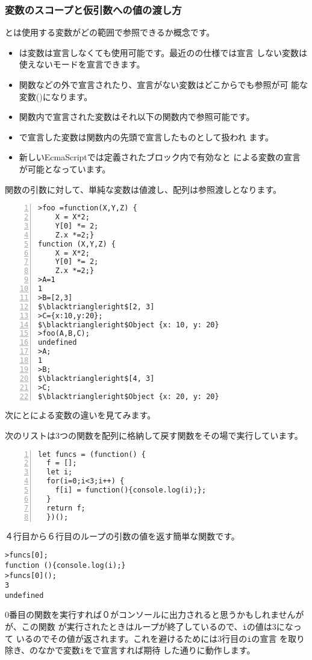 \subsubsection{変数のスコープと仮引数への値の渡し方}
とは使用する変数がどの範囲で参照できるか概念です。
\begin{itemize}
 \item \JS は変数は宣言しなくても使用可能です。最近の\JS の仕様では宣言
			 しない変数は使えないモードを宣言できます。
 \item 関数などの外で宣言されたり、宣言がない変数はどこからでも参照が可
			 能な変数()になります。
 \item 関数内で宣言された変数はそれ以下の関数内で参照可能です。
 \item {}で宣言した変数は関数内の先頭で宣言したものとして扱われ
			 ます。
 \item 新しいEcmaScriptでは定義されたブロック内で有効なと
			 による変数の宣言が可能となっています。
\end{itemize}
関数の引数に対して、単純な変数は値渡し、配列は参照渡しとなります。
\begin{Verbatim}[numbers=left, fontsize=\small,
	commandchars=\\//,codes={\catcode`$=3\catcode`^=7}]
>foo =function(X,Y,Z) {
    X = X*2;
    Y[0] *= 2;
    Z.x *=2;}
function (X,Y,Z) {
    X = X*2;
    Y[0] *= 2;
    Z.x *=2;}
>A=1
1
>B=[2,3]
$\blacktriangleright$[2, 3]
>C={x:10,y:20};
$\blacktriangleright$Object {x: 10, y: 20}
>foo(A,B,C);
undefined
>A;
1
>B;
$\blacktriangleright$[4, 3]
>C;
$\blacktriangleright$Object {x: 20, y: 20}
\end{Verbatim}
次にとによる変数の違いを見てみます。

次のリストは3つの関数を配列に格納して戻す関数をその場で実行しています。
\begin{Verbatim}[numbers=left]
let funcs = (function() {
  f = [];
  let i;
  for(i=0;i<3;i++) {
    f[i] = function(){console.log(i);};
  }
  return f;
  })();
\end{Verbatim}
４行目から６行目のループの引数の値を返す簡単な関数です。
\begin{Verbatim}
>funcs[0];
function (){console.log(i);}
>funcs[0]();
3
undefined
\end{Verbatim}
0番目の関数を実行すれば０がコンソールに出力されると思うかもしれませんがが、この関数
が実行されたときはループが終了しているので、\texttt{i}の値は3になって
いるのでその値が返されます。これを避けるためには3行目の\texttt{i}の宣言
を取り除き、のなかで変数\texttt{i}をで宣言すれば期待
した通りに動作します。


